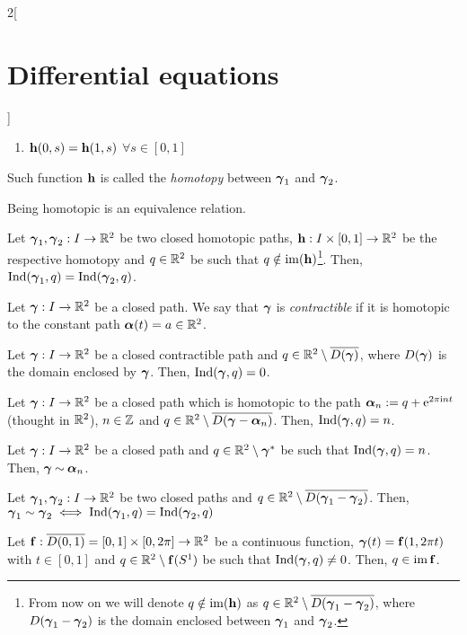 \documentclass[../../../main_math.tex]{subfiles}
\begin{document}
\begin{multicols}{2}[\section{Differential equations}]
\begin{definition}
\begin{enumerate}
      \item $\vf{h}(0,s)=\vf{h}(1,s)$ $\forall s\in [0,1]$
    \end{enumerate}
    Such function $\vf{h}$ is called the \emph{homotopy} between $\vf\gamma_1$ and $\vf\gamma_2$.
  \end{definition}
  \begin{lemma}
    Being homotopic is an equivalence relation.
  \end{lemma}
  \begin{proposition}
    Let $\vf\gamma_1,\vf\gamma_2:I\rightarrow\RR^2$ be two closed homotopic paths, $\vf{h}:I\times[0,1]\rightarrow\RR^2$ be the respective homotopy and $q\in\RR^2$ be such that $q\notin \im(\vf{h})$\footnote{From now on we will denote $q\notin \im(\vf{h})$ as $q\in\RR^2\setminus \overline{D(\vf\gamma_1-\vf\gamma_2)}$, where $D(\vf\gamma_1-\vf\gamma_2)$ is the domain enclosed between $\vf\gamma_1$ and $\vf\gamma_2$.}. Then, $\Ind(\vf\gamma_1,q)=\Ind(\vf\gamma_2,q)$.
  \end{proposition}
  \begin{definition}
    Let $\vf\gamma:I\rightarrow\RR^2$ be a closed path. We say that $\vf\gamma$ is \emph{contractible} if it is homotopic to the constant path ${\vf\alpha}(t)=a\in\RR^2$.
  \end{definition}
  \begin{proposition}
    Let $\vf\gamma:I\rightarrow\RR^2$ be a closed contractible path and $q\in\RR^2\setminus \overline{D(\vf\gamma)}$, where $D(\vf\gamma)$ is the domain enclosed by $\vf\gamma$. Then, $\Ind(\vf\gamma,q)=0$.
  \end{proposition}
  \begin{proposition}
    Let $\vf\gamma:I\rightarrow\RR^2$ be a closed path which is homotopic to the path $\vf\alpha_n:=q+\exp{2\pi\ii n t}$ (thought in $\RR^2$), $n\in\ZZ$ and $q\in\RR^2\setminus \overline{D(\vf\gamma-\vf\alpha_n)}$. Then, $\Ind(\vf\gamma,q)=n$.
  \end{proposition}
  \begin{proposition}
    Let $\vf\gamma:I\rightarrow\RR^2$ be a closed path and $q\in\RR^2\setminus\vf\gamma^*$ be such that $\Ind(\vf\gamma,q)=n$. Then, $\vf\gamma\homotop\vf\alpha_n$.
  \end{proposition}
  \begin{theorem}
    Let $\vf\gamma_1,\vf\gamma_2:I\rightarrow\RR^2$ be two closed paths and $q\in\RR^2\setminus \overline{D(\vf\gamma_1-\vf\gamma_2)}$. Then, $\vf\gamma_1\sim\vf\gamma_2\iff\Ind(\vf\gamma_1,q)=\Ind(\vf\gamma_2,q)$
  \end{theorem}
  \begin{theorem}
    Let $\vf{f}:\overline{D(0,1)}=[0,1]\times[0,2\pi]\rightarrow\RR^2$ be a continuous function, $\vf\gamma(t)=\vf{f}(1,2\pi t)$ with $t\in[0,1]$ and $q\in\RR^2\setminus \vf{f}(S^1)$ be such that $\Ind(\vf\gamma,q)\ne 0$. Then, $q\in \im\vf{f}$.
  \end{theorem}

\end{multicols}
\end{document}
